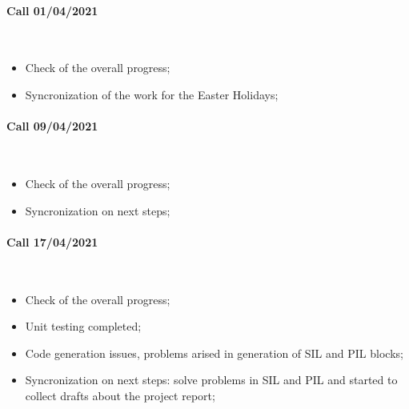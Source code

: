 \documentclass[12pt,a4paper]{report}
\begin{document}
\paragraph{Call 01/04/2021 \\}~

\begin{itemize}
	\item Check of the overall progress;
	
	\item Syncronization of the work for the Easter Holidays;

\end{itemize}

\paragraph{Call 09/04/2021 \\}~

\begin{itemize}
	\item Check of the overall progress;
	
	\item Syncronization on next steps;
	
\end{itemize}

\paragraph{Call 17/04/2021 \\}~

\begin{itemize}
	\item Check of the overall progress;
	
	\item Unit testing completed;
	
	\item Code generation issues, problems arised in generation of SIL and PIL blocks;
	
	\item Syncronization on next steps: solve problems in SIL and PIL and started to collect drafts about the project report;
	
\end{itemize}
\end{document}
